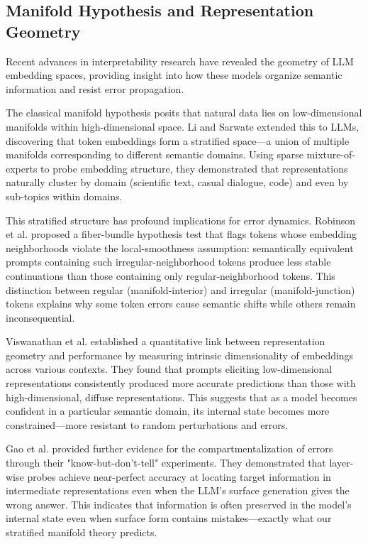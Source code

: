 \documentclass{article}
\begin{document}
\subsection{Manifold Hypothesis and Representation Geometry}

Recent advances in interpretability research have revealed the geometry of LLM embedding spaces, providing insight into how these models organize semantic information and resist error propagation.

The classical manifold hypothesis posits that natural data lies on low-dimensional manifolds within high-dimensional space. Li and Sarwate \citep{li2025unraveling} extended this to LLMs, discovering that token embeddings form a stratified space—a union of multiple manifolds corresponding to different semantic domains. Using sparse mixture-of-experts to probe embedding structure, they demonstrated that representations naturally cluster by domain (scientific text, casual dialogue, code) and even by sub-topics within domains.

This stratified structure has profound implications for error dynamics. Robinson et al. \citep{robinson2025token} proposed a fiber-bundle hypothesis test that flags tokens whose embedding neighborhoods violate the local-smoothness assumption: semantically equivalent prompts containing such irregular-neighborhood tokens produce less stable continuations than those containing only regular-neighborhood tokens. This distinction between regular (manifold-interior) and irregular (manifold-junction) tokens explains why some token errors cause semantic shifts while others remain inconsequential.

Viswanathan et al. \citep{viswanathan2024geometry} established a quantitative link between representation geometry and performance by measuring intrinsic dimensionality of embeddings across various contexts. They found that prompts eliciting low-dimensional representations consistently produced more accurate predictions than those with high-dimensional, diffuse representations. This suggests that as a model becomes confident in a particular semantic domain, its internal state becomes more constrained—more resistant to random perturbations and errors.

Gao et al. \citep{gao2024insights} provided further evidence for the compartmentalization of errors through their "know-but-don't-tell" experiments. They demonstrated that layer-wise probes achieve near-perfect accuracy at locating target information in intermediate representations even when the LLM's surface generation gives the wrong answer. This indicates that information is often preserved in the model's internal state even when surface form contains mistakes—exactly what our stratified manifold theory predicts.
\end{document}
